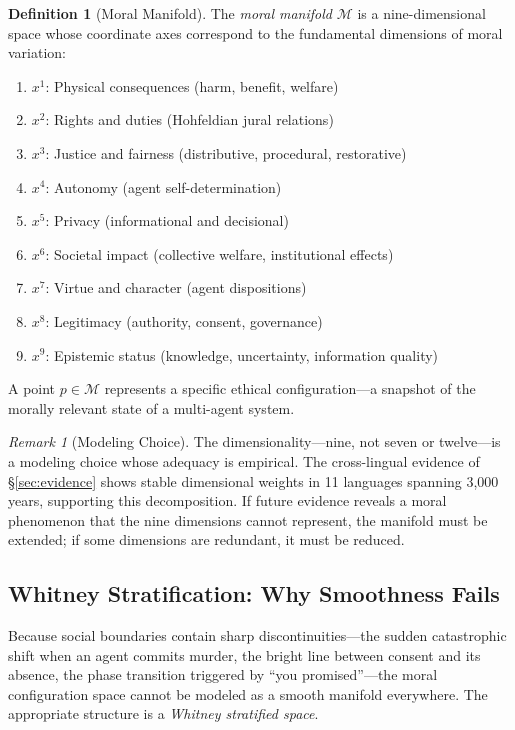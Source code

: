 \documentclass[12pt,letterpaper]{article}
\theoremstyle{definition}
\newtheorem{definition}[theorem]{Definition}
\theoremstyle{remark}
\newtheorem{remark}[theorem]{Remark}
\newcommand{\M}{\mathcal{M}}
\begin{document}
\begin{definition}[Moral Manifold]
\label{def:moral_manifold}
The \emph{moral manifold} $\M$ is a nine-dimensional space whose coordinate axes correspond to the fundamental dimensions of moral variation:
\begin{enumerate}
    \item $x^1$: Physical consequences (harm, benefit, welfare)
    \item $x^2$: Rights and duties (Hohfeldian jural relations)
    \item $x^3$: Justice and fairness (distributive, procedural, restorative)
    \item $x^4$: Autonomy (agent self-determination)
    \item $x^5$: Privacy (informational and decisional)
    \item $x^6$: Societal impact (collective welfare, institutional effects)
    \item $x^7$: Virtue and character (agent dispositions)
    \item $x^8$: Legitimacy (authority, consent, governance)
    \item $x^9$: Epistemic status (knowledge, uncertainty, information quality)
\end{enumerate}
A point $p \in \M$ represents a specific ethical configuration---a snapshot of the morally relevant state of a multi-agent system.
\end{definition}

\begin{remark}[Modeling Choice]
The dimensionality---nine, not seven or twelve---is a modeling choice whose adequacy is empirical. The cross-lingual evidence of \S\ref{sec:evidence} shows stable dimensional weights in 11 languages spanning 3,000 years, supporting this decomposition. If future evidence reveals a moral phenomenon that the nine dimensions cannot represent, the manifold must be extended; if some dimensions are redundant, it must be reduced.
\end{remark}

\subsection{Whitney Stratification: Why Smoothness Fails}

Because social boundaries contain sharp discontinuities---the sudden catastrophic shift when an agent commits murder, the bright line between consent and its absence, the phase transition triggered by ``you promised''---the moral configuration space cannot be modeled as a smooth manifold everywhere. The appropriate structure is a \emph{Whitney stratified space}.
\end{document}
